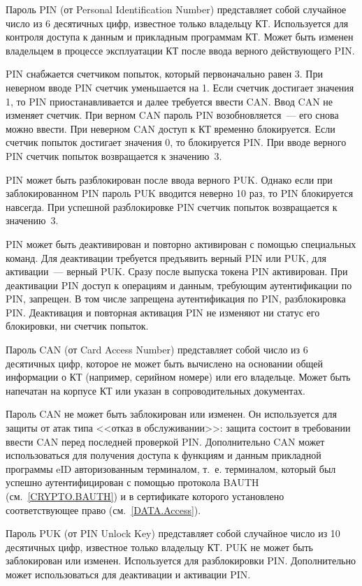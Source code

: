 Пароль PIN (от Personal Identification Number)
представляет собой случайное число из 6 десятичных цифр,
известное только владельцу КТ. Используется для контроля доступа к данным и 
прикладным программам КТ. Может быть изменен владельцем в процессе
эксплуатации КТ после ввода верного действующего PIN.

PIN снабжается счетчиком попыток, который первоначально равен 3. При 
неверном вводе PIN счетчик уменьшается на 1. Если счетчик достигает 
значения 1, то PIN приостанавливается и далее требуется ввести CAN. 
Ввод CAN не изменяет счетчик. При верном CAN пароль PIN возобновляется~--- 
его снова можно ввести. При неверном CAN доступ к КТ временно блокируется. 
Если счетчик попыток достигает значения 0, то блокируется PIN. 
%
При вводе верного PIN счетчик попыток возвращается к значению~$3$.

PIN может быть разблокирован после ввода верного PUK. Однако если при 
заблокированном PIN пароль PUK вводится неверно 10 раз, то PIN блокируется 
навсегда.
%
При успешной разблокировке PIN счетчик попыток возвращается к значению~$3$. 

PIN может быть деактивирован и повторно активирован с помощью специальных команд.
Для деактивации требуется предъявить верный PIN или PUK, 
для активации~--- верный PUK. Сразу после выпуска токена PIN активирован. 
При деактивации PIN доступ к операциям и данным, требующим аутентификации по 
PIN, запрещен. В том числе запрещена аутентификация по PIN, разблокировка PIN.
Деактивация и повторная активация PIN не изменяют ни статус его блокировки, 
ни счетчик попыток. 

Пароль CAN (от Card Access Number) представляет собой число из 6 десятичных 
цифр, которое не может быть вычислено на основании общей информации о КТ 
(например, серийном номере) или его владельце. Может быть напечатан на корпусе 
КТ или указан в сопроводительных документах. 

Пароль CAN не может быть заблокирован или изменен. Он используется для защиты 
от атак типа <<отказ в обслуживании>>: защита состоит в требовании ввести CAN перед 
последней проверкой PIN. Дополнительно CAN может использоваться для 
получения доступа к функциям и данным прикладной программы eID 
авторизованным терминалом, т.~е. терминалом, который был успешно 
аутентифицирован с помощью протокола BAUTH (см.~\ref{CRYPTO.BAUTH}) и в 
сертификате которого установлено соответствующее право (см.~\ref{DATA.Access}). 

Пароль PUK (от PIN Unlock Key) представляет собой случайное число из 10 
десятичных цифр, известное только владельцу КТ. PUK не может быть заблокирован 
или изменен. Используется для разблокировки PIN. Дополнительно может использоваться 
для деактивации и активации PIN.


